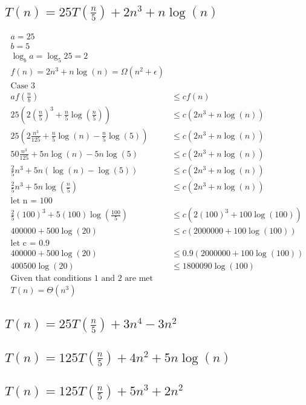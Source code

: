 \documentclass{article}
\begin{document}
    \subsection{\(T(n) = 25T(\frac{n}{5}) + 2n^3 + n \log(n)\)}
      \begin{align*}
        a = 25 \\
        b = 5 \\
        \log_b{a} = \log_5{25} = 2 \\
        f(n) = 2n^3 + n \log(n) = \Omega(n^2 + \epsilon) \\
        \text{Case 3} \\
        af(\frac{n}{b}) & \leq cf(n) \\
        25(2(\frac{n}{5})^3 + \frac{n}{5} \log(\frac{n}{5})) & \leq c(2n^3 + n \log(n)) \\
        25(2\frac{n^3}{125} + \frac{n}{5} \log(n) - \frac{n}{5} \log(5)) & \leq c(2n^3 + n \log(n)) \\
        50\frac{n^3}{125} + 5n \log(n) - 5n \log(5) & \leq c(2n^3 + n \log(n)) \\
        \frac{2}{5}n^3 + 5n(\log(n) - \log(5)) & \leq c(2n^3 + n \log(n)) \\
        \frac{2}{5}n^3 + 5n\log(\frac{n}{5}) & \leq c(2n^3 + n \log(n)) \\
        \text{let n = 100} \\
        \frac{2}{5}(100)^3 + 5(100)\log(\frac{100}{5}) & \leq c(2(100)^3 + 100 \log(100)) \\
        400000 + 500 \log(20) & \leq c(2000000 + 100 \log(100)) \\
        \text{let c = 0.9} \\
        400000 + 500 \log(20) & \leq 0.9(2000000 + 100 \log(100)) \\
        400500\log(20) & \leq 1800090 \log(100) \\
        \text{Given that conditions 1 and 2 are met} \\
        T(n) = \Theta(n^3)
      \end{align*}
    \subsection{\(T(n) = 25T(\frac{n}{5}) + 3n^4 - 3n^2\)}
    \subsection{\(T(n) = 125T(\frac{n}{5}) + 4n^2 + 5n \log(n)\)}
    \subsection{\(T(n) = 125T(\frac{n}{5}) + 5n^3 + 2n^2\)}
\end{document}
